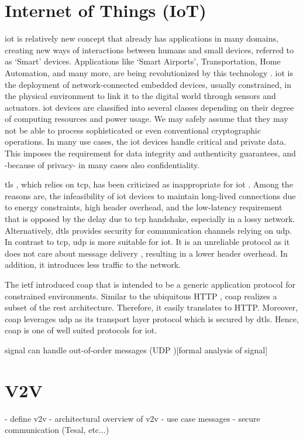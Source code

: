 \section{Internet of Things (IoT)}
\gls{iot} is relatively new concept that already has applications in many domains, creating new ways of interactions between humans and small devices, referred to as `Smart' devices. Applications like `Smart Airports', Transportation, Home Automation, and many more, are being revolutionized by this technology \cite{marksteiner2017overview}.
\gls{iot} is the deployment of network-connected embedded devices, usually constrained, in the physical environment to link it to the digital world through sensors and actuators. \gls{iot} devices are classified into several classes depending on their degree of computing resources and power usage. We may safely assume that they may not be able to process sophisticated or even conventional cryptographic operations. In many use cases, the \gls{iot} devices handle critical and private data. This imposes the requirement for data integrity and authenticity guarantees, and -because of privacy- in many cases also confidentiality.
\par
\gls{tls} \cite{rfc5246}, which relies on \gls{tcp}, has been criticized as inappropriate for \gls{iot} \cite{shang2016challenges}. Among the reasons are, the infeasibility of \gls{iot} devices to maintain long-lived connections due to energy constraints, high header overhead, and the low-latency requirement that is opposed by the delay due to \gls{tcp} handshake, especially in a lossy network.
Alternatively, \gls{dtls} \cite{dtls} provides security for communication channels relying on \gls{udp}. In contrast to \gls{tcp}, \gls{udp} is more suitable for \gls{iot}. It is an unreliable protocol as it does not care about message delivery , resulting in a lower header overhead. In addition, it introduces less traffic to the network.
\par
The \gls{ietf} introduced \gls{coap} \cite{rfc7252} that is intended to be a generic application protocol for constrained environments. Similar to the ubiquitous HTTP \cite{http}, \gls{coap} realizes a subset of the \gls{rest} architecture. Therefore, it easily translates to HTTP. Moreover, \gls{coap} leverages \gls{udp} as its transport layer protocol which is secured by \gls{dtls}. Hence, \gls{coap} is one of well suited protocols for \gls{iot}.

signal can handle out-of-order messages (UDP )[formal analysis of signal]

\section{V2V}
- define v2v
- architectural overview of v2v
- use case messages
- secure communication (Tesal, etc...)

